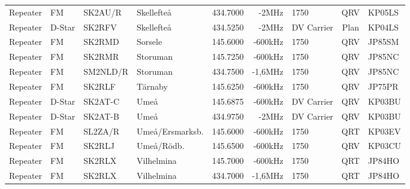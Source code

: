 \begin{landscape}
\begin{longtable}{llllrrlcl}
	Repeater                  & FM            & SK2AU/R       & Skellefteå          & 434.7000          & -2MHz          & 1750             & QRV             & KP05LS           \\
	Repeater                  & D-Star        & SK2RFV        & Skellefteå          & 434.5250          & -2MHz          & DV Carrier       & Plan            & KP04LS           \\
	Repeater                  & FM            & SK2RMD        & Sorsele             & 145.6000          & -600kHz        & 1750             & QRV             & JP85SM           \\
	Repeater                  & FM            & SK2RMR        & Storuman            & 145.7250          & -600kHz        & 1750             & QRV             & JP85NC           \\
	Repeater                  & FM            & SM2NLD/R      & Storuman            & 434.7500          & -1,6MHz        & 1750             & QRV             & JP85NC           \\
	Repeater                  & FM            & SK2RLF        & Tärnaby             & 145.6250          & -600kHz        & 1750             & QRV             & JP75PR           \\
	Repeater                  & D-Star        & SK2AT-C       & Umeå                & 145.6875          & -600kHz        & DV Carrier       & QRV             & KP03BU           \\
	Repeater                  & D-Star        & SK2AT-B       & Umeå                & 434.9750          & -2MHz          & DV Carrier       & QRV             & KP03BU           \\
	Repeater                  & FM            & SL2ZA/R       & Umeå/Ersmarksb.     & 145.6000          & -600kHz        & 1750             & QRT             & KP03EV           \\
	Repeater                  & FM            & SK2RLJ        & Umeå/Rödb.          & 145.6500          & -600kHz        & 1750             & QRV             & KP03CU           \\
	Repeater                  & FM            & SK2RLX        & Vilhelmina          & 145.7000          & -600kHz        & 1750             & QRT             & JP84HO           \\
	Repeater                  & FM            & SK2RLX        & Vilhelmina          & 434.7000          & -1,6MHz        & 1750             & QRT             & JP84HO           \\

\end{longtable}
\end{landscape}
